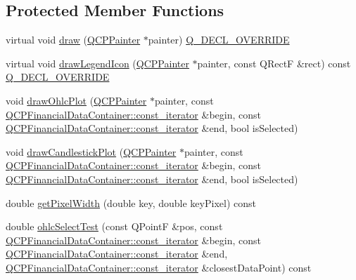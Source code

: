\subsection*{Protected Member Functions}
\begin{DoxyCompactItemize}
\item 
virtual void \hyperlink{class_q_c_p_financial_a4d62b7a618d609321adb5f5f1e31f446}{draw} (\hyperlink{class_q_c_p_painter}{Q\+C\+P\+Painter} $\ast$painter) \hyperlink{qcustomplot_8h_a42cc5eaeb25b85f8b52d2a4b94c56f55}{Q\+\_\+\+D\+E\+C\+L\+\_\+\+O\+V\+E\+R\+R\+I\+DE}
\item 
virtual void \hyperlink{class_q_c_p_financial_a53f6ef2cddb650993f04c66e39a04942}{draw\+Legend\+Icon} (\hyperlink{class_q_c_p_painter}{Q\+C\+P\+Painter} $\ast$painter, const Q\+RectF \&rect) const \hyperlink{qcustomplot_8h_a42cc5eaeb25b85f8b52d2a4b94c56f55}{Q\+\_\+\+D\+E\+C\+L\+\_\+\+O\+V\+E\+R\+R\+I\+DE}
\item 
void \hyperlink{class_q_c_p_financial_a2c77aab636f6bce6e0407b3f94e90d08}{draw\+Ohlc\+Plot} (\hyperlink{class_q_c_p_painter}{Q\+C\+P\+Painter} $\ast$painter, const \hyperlink{class_q_c_p_data_container_ae40a91f5cb0bcac61d727427449b7d15}{Q\+C\+P\+Financial\+Data\+Container\+::const\+\_\+iterator} \&begin, const \hyperlink{class_q_c_p_data_container_ae40a91f5cb0bcac61d727427449b7d15}{Q\+C\+P\+Financial\+Data\+Container\+::const\+\_\+iterator} \&end, bool is\+Selected)
\item 
void \hyperlink{class_q_c_p_financial_ade6b703369d8acb3bfa0b8e244df4b06}{draw\+Candlestick\+Plot} (\hyperlink{class_q_c_p_painter}{Q\+C\+P\+Painter} $\ast$painter, const \hyperlink{class_q_c_p_data_container_ae40a91f5cb0bcac61d727427449b7d15}{Q\+C\+P\+Financial\+Data\+Container\+::const\+\_\+iterator} \&begin, const \hyperlink{class_q_c_p_data_container_ae40a91f5cb0bcac61d727427449b7d15}{Q\+C\+P\+Financial\+Data\+Container\+::const\+\_\+iterator} \&end, bool is\+Selected)
\item 
double \hyperlink{class_q_c_p_financial_a3ff49384a95233140c8205af77c08955}{get\+Pixel\+Width} (double key, double key\+Pixel) const
\item 
double \hyperlink{class_q_c_p_financial_a2bf2228cc443eb5fb11ec3ea3902859c}{ohlc\+Select\+Test} (const Q\+PointF \&pos, const \hyperlink{class_q_c_p_data_container_ae40a91f5cb0bcac61d727427449b7d15}{Q\+C\+P\+Financial\+Data\+Container\+::const\+\_\+iterator} \&begin, const \hyperlink{class_q_c_p_data_container_ae40a91f5cb0bcac61d727427449b7d15}{Q\+C\+P\+Financial\+Data\+Container\+::const\+\_\+iterator} \&end, \hyperlink{class_q_c_p_data_container_ae40a91f5cb0bcac61d727427449b7d15}{Q\+C\+P\+Financial\+Data\+Container\+::const\+\_\+iterator} \&closest\+Data\+Point) const

\end{DoxyCompactItemize}
